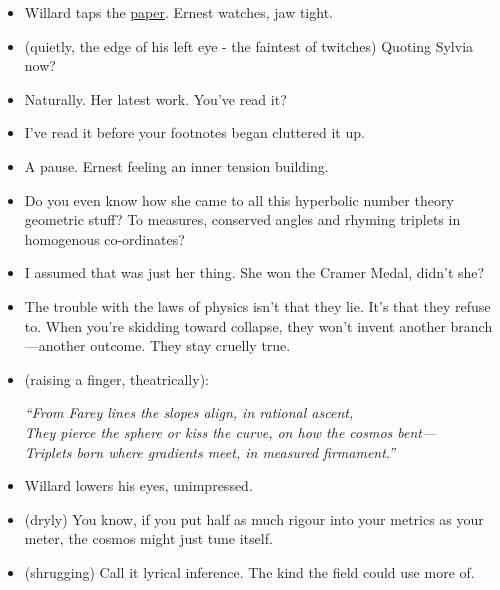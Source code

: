 \begin{itemize}[leftmargin=2cm, label={}]

\item[]Willard taps the \href{https://www.researchgate.net/publication/392402161_From_Spinor_Dynamics_to_Gravitational_Constraint_A_Tarskian_Interpretation_of_the_Einstein_Equations}{paper}. Ernest watches, jaw tight.

\item[\textbf{Ernest:}] (quietly, the edge of his left eye - the faintest of twitches) Quoting Sylvia now?

\item[\textbf{Willard:}] Naturally. Her latest work. You've read it?

\item[\textbf{Ernest :}] I've read it before your footnotes began cluttered it up.

\item[] A pause. Ernest feeling an inner tension building.

\item[\textbf{Ernest:}] Do you even know how she came to all this hyperbolic number theory geometric stuff? To measures, conserved angles and rhyming triplets in homogenous co-ordinates?

\item[\textbf{Willard:}] I assumed that was just her thing. She won the Cramer Medal, didn’t she?

\item[\textbf{Ernest:}]The trouble with the laws of physics isn’t that they lie. It’s that they refuse to. When you're skidding toward collapse, they won’t invent another branch—another outcome. They stay cruelly true.

\item[\textbf{Ernest:}]  (raising a finger, theatrically):

\begin{center}
    
\textit{“From Farey lines the slopes align, in rational ascent,} \\
\textit{They pierce the sphere or kiss the curve, on how the cosmos bent—} \\
\textit{Triplets born where gradients meet, in measured firmament.”}

\end{center}

\item[] Willard lowers his eyes, unimpressed.

\item[\textbf{Willard:}] (dryly) 
You know, if you put half as much rigour into your metrics as your meter, the cosmos might just tune itself.

\item[\textbf{Ernest :}] (shrugging)  
Call it lyrical inference. The kind the field could use more of.
\end{itemize}

